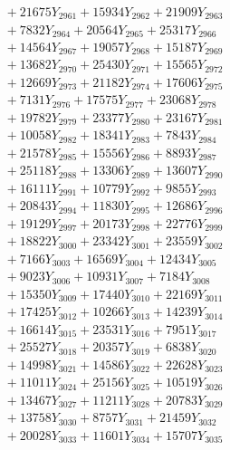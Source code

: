 \documentclass[a4paper,10pt]{article}
\begin{document}
{\begin{align}
&\;  + 21675 Y_{2961} + 15934 Y_{2962} + 21909 Y_{2963} \\[0.3ex]
&\;  + 7832 Y_{2964} + 20564 Y_{2965} + 25317 Y_{2966} \\[0.3ex]
&\;  + 14564 Y_{2967} + 19057 Y_{2968} + 15187 Y_{2969} \\[0.5ex]\allowbreak
&\;  + 13682 Y_{2970} + 25430 Y_{2971} + 15565 Y_{2972} \\[0.3ex]
&\;  + 12669 Y_{2973} + 21182 Y_{2974} + 17606 Y_{2975} \\[0.3ex]
&\;  + 7131 Y_{2976} + 17575 Y_{2977} + 23068 Y_{2978} \\[0.3ex]
&\;  + 19782 Y_{2979} + 23377 Y_{2980} + 23167 Y_{2981} \\[0.3ex]
&\;  + 10058 Y_{2982} + 18341 Y_{2983} + 7843 Y_{2984} \\[0.3ex]
&\;  + 21578 Y_{2985} + 15556 Y_{2986} + 8893 Y_{2987} \\[0.3ex]
&\;  + 25118 Y_{2988} + 13306 Y_{2989} + 13607 Y_{2990} \\[0.3ex]
&\;  + 16111 Y_{2991} + 10779 Y_{2992} + 9855 Y_{2993} \\[0.3ex]
&\;  + 20843 Y_{2994} + 11830 Y_{2995} + 12686 Y_{2996} \\[0.3ex]
&\;  + 19129 Y_{2997} + 20173 Y_{2998} + 22776 Y_{2999} \\[0.5ex]\allowbreak
&\;  + 18822 Y_{3000} + 23342 Y_{3001} + 23559 Y_{3002} \\[0.3ex]
&\;  + 7166 Y_{3003} + 16569 Y_{3004} + 12434 Y_{3005} \\[0.3ex]
&\;  + 9023 Y_{3006} + 10931 Y_{3007} + 7184 Y_{3008} \\[0.3ex]
&\;  + 15350 Y_{3009} + 17440 Y_{3010} + 22169 Y_{3011} \\[0.3ex]
&\;  + 17425 Y_{3012} + 10266 Y_{3013} + 14239 Y_{3014} \\[0.3ex]
&\;  + 16614 Y_{3015} + 23531 Y_{3016} + 7951 Y_{3017} \\[0.3ex]
&\;  + 25527 Y_{3018} + 20357 Y_{3019} + 6838 Y_{3020} \\[0.3ex]
&\;  + 14998 Y_{3021} + 14586 Y_{3022} + 22628 Y_{3023} \\[0.3ex]
&\;  + 11011 Y_{3024} + 25156 Y_{3025} + 10519 Y_{3026} \\[0.3ex]
&\;  + 13467 Y_{3027} + 11211 Y_{3028} + 20783 Y_{3029} \\[0.5ex]\allowbreak
&\;  + 13758 Y_{3030} + 8757 Y_{3031} + 21459 Y_{3032} \\[0.3ex]
&\;  + 20028 Y_{3033} + 11601 Y_{3034} + 15707 Y_{3035} \\[0.3ex]

\end{align}}
\end{document}
